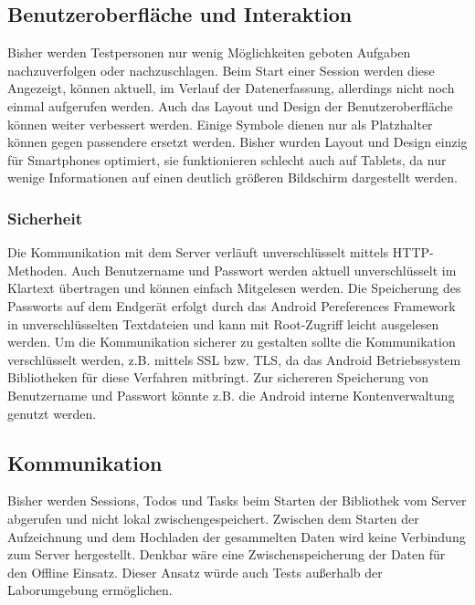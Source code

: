 \subsection{Benutzeroberfläche und Interaktion}
Bisher werden Testpersonen nur wenig Möglichkeiten geboten Aufgaben nachzuverfolgen oder nachzuschlagen.
Beim Start einer Session werden diese Angezeigt, können aktuell, im Verlauf der Datenerfassung, allerdings nicht noch einmal aufgerufen werden.
Auch das Layout und Design der Benutzeroberfläche können weiter verbessert werden.
Einige Symbole dienen nur als Platzhalter können gegen passendere ersetzt werden.
Bisher wurden Layout und Design einzig für Smartphones optimiert, sie funktionieren schlecht auch auf Tablets, da nur wenige Informationen auf einen deutlich größeren Bildschirm dargestellt werden.

\subsubsection{Sicherheit}
Die Kommunikation mit dem Server verläuft unverschlüsselt mittels \ac{HTTP}-Methoden.
Auch Benutzername und Passwort werden aktuell unverschlüsselt im Klartext übertragen und können einfach Mitgelesen werden.
Die Speicherung des Passworts auf dem Endgerät erfolgt durch das Android Pereferences Framework in unverschlüsselten Textdateien und kann mit Root-Zugriff leicht ausgelesen werden.  
Um die Kommunikation sicherer zu gestalten sollte die Kommunikation verschlüsselt werden, z.B. mittels \ac{SSL} bzw. \ac{TLS}, da das Android Betriebssystem Bibliotheken für diese Verfahren mitbringt.
Zur sichereren Speicherung von Benutzername und Passwort könnte z.B. die Android interne Kontenverwaltung genutzt werden.

\subsection{Kommunikation}
Bisher werden Sessions, Todos und Tasks beim Starten der Bibliothek vom Server abgerufen und nicht lokal zwischengespeichert. 
Zwischen dem Starten der Aufzeichnung und dem Hochladen der gesammelten Daten wird keine Verbindung zum Server hergestellt.
Denkbar wäre eine Zwischenspeicherung der Daten für den Offline Einsatz.
Dieser Ansatz würde auch Tests außerhalb der Laborumgebung ermöglichen.